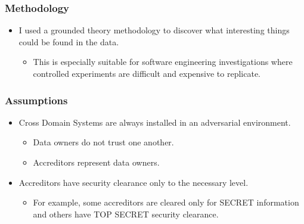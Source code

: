 \documentclass{beamer}
\begin{document}
\begin{frame}
	\frametitle{Methodology}
	\begin{itemize}
		\item I used a grounded theory methodology to discover what interesting things
			could be found in the data.
			\begin{itemize}
				\item This is especially suitable for software engineering investigations
					where controlled experiments are difficult and expensive to replicate.
			\end{itemize}
	\end{itemize}
\end{frame}

\begin{frame}
	\frametitle{Assumptions}
	\begin{itemize}
		\item Cross Domain Systems are always installed in an adversarial environment.
			\begin{itemize}
				\item Data owners do not trust one another.
				\item Accreditors represent data owners.
			\end{itemize}
		\item Accreditors have security clearance only to the necessary level.
			\begin{itemize}
				\item For example, some accreditors are cleared only for SECRET information
					and others have TOP SECRET security clearance.
			\end{itemize}
	\end{itemize}
\end{frame}
\end{document}
